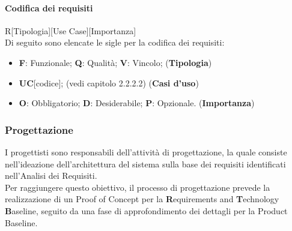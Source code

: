 \paragraph{Codifica dei requisiti}

R[Tipologia][Use Case][Importanza] \\
Di seguito sono elencate le sigle per la codifica dei requisiti: 
\begin{itemize}
    \item \textbf{F}: Funzionale; \textbf{Q}: Qualità; \textbf{V}: Vincolo; (\textbf{Tipologia})
    \item \textbf{UC}[codice]; (vedi capitolo 2.2.2.2) (\textbf{Casi d'uso})
    \item \textbf{O}: Obbligatorio; \textbf{D}: Desiderabile; \textbf{P}: Opzionale. (\textbf{Importanza})
\end{itemize}

\subsubsection{Progettazione} 
I progettisti sono responsabili dell'attività di progettazione, la quale consiste nell'ideazione dell'architettura del sistema sulla base dei requisiti 
identificati nell'Analisi dei Requisiti. \\
Per raggiungere questo obiettivo, il processo di progettazione prevede la realizzazione di un Proof of Concept 
per la \textbf{R}equirements and \textbf{T}echnology \textbf{B}aseline, seguito da una fase di approfondimento dei dettagli per la Product Baseline.

